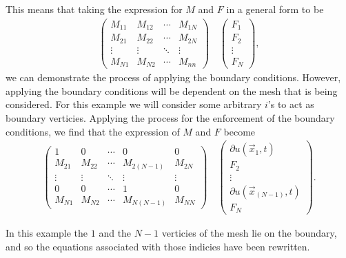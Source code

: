\documentclass[../fem.tex]{subfile}
\begin{document}
This means that taking the expression for $M$ and $F$ in a general form to be
\begin{align*}
   \begin{pmatrix}
     M_{11} & M_{12} & \cdots & M_{1N} \\
     M_{21} & M_{22} & \cdots & M_{2N}\\
     \vdots & \vdots & \ddots & \vdots \\
     M_{N1} & M_{N2} & \cdots & M_{nn}
   \end{pmatrix}\quad
   \begin{pmatrix}
      F_1 \\
      F_2 \\
      \vdots \\
      F_N
   \end{pmatrix},
\end{align*}
we can demonstrate the process of applying the boundary conditions. However,
applying the boundary conditions will be dependent on the mesh that is being
considered. For this example we will consider some arbitrary $i$'s to act as
boundary verticies. Applying the process for the enforcement of the boundary
conditions, we find that the expression of $M$ and $F$ become
\begin{align*}
   \begin{pmatrix}
     1 & 0 & \cdots & 0 & 0\\
     M_{21} & M_{22} & \cdots & M_{2(N-1)} & M_{2N}\\
     \vdots & \vdots & \ddots & \vdots & \vdots \\
     0 & 0 & \cdots & 1 & 0\\
     M_{N1} & M_{N2} & \cdots & M_{N(N-1)} & M_{NN}
   \end{pmatrix}\quad
   \begin{pmatrix}
      \partial u(\vec{x}_1,t)\\
      F_2 \\
      \vdots \\
      \partial u(\vec{x}_{(N-1)},t)\\
      F_N
   \end{pmatrix}.
\end{align*}

In this example the $1$ and the $N-1$ verticies of the mesh lie on the
boundary, and so the equations associated with those indicies have been
rewritten.
\end{document}
